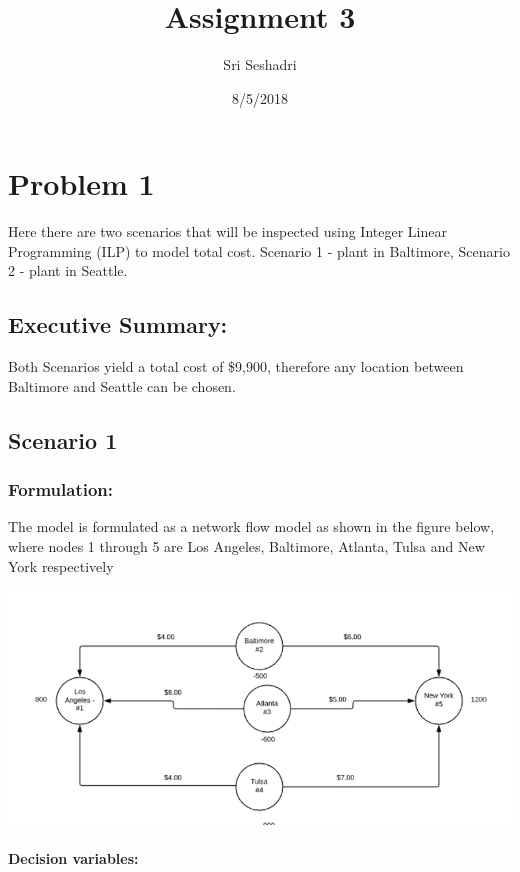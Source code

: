 \documentclass[]{article}
\title{Assignment 3}
\author{Sri Seshadri}
\date{8/5/2018}
\let\oldparagraph\paragraph
\renewcommand{\paragraph}[1]{\oldparagraph{#1}\mbox{}}
\begin{document}
\maketitle

\section{Problem 1}\label{problem-1}

Here there are two scenarios that will be inspected using Integer Linear
Programming (ILP) to model total cost. Scenario 1 - plant in Baltimore,
Scenario 2 - plant in Seattle.

\subsection{Executive Summary:}\label{executive-summary}

Both Scenarios yield a total cost of \$9,900, therefore any location
between Baltimore and Seattle can be chosen.

\subsection{Scenario 1}\label{scenario-1}

\subsubsection{Formulation:}\label{formulation}

The model is formulated as a network flow model as shown in the figure
below, where nodes 1 through 5 are Los Angeles, Baltimore, Atlanta,
Tulsa and New York respectively

\begin{center}\includegraphics{Figures/Homework3/1aFig} \end{center}

\paragraph{Decision variables:}\label{decision-variables}
\end{document}
